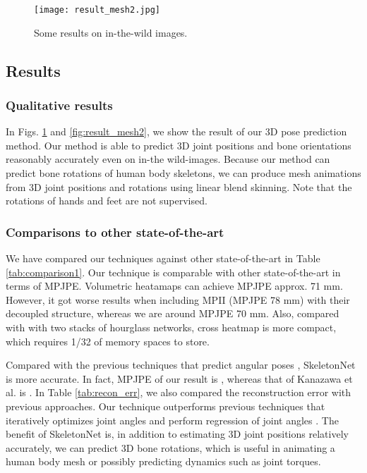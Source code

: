 \begin{figure}[tb]
	\centering
	\texttt{[image: result\_mesh2.jpg]}
	\caption{Some results on in-the-wild images. }
	\label{fig:result_mesh}
\end{figure}

\subsection{Results}
\subsubsection{Qualitative results}

In Figs. \ref{fig:result_mesh} and \ref{fig:result_mesh2}, we show the result of our 3D pose prediction method. Our method is able to predict 3D joint positions and bone orientations reasonably accurately even on in-the wild-images. Because our method can predict bone rotations of human body skeletons, we can produce mesh animations from 3D joint positions and rotations using linear blend skinning. Note that the rotations of hands and feet are not supervised.     





\subsubsection{Comparisons to other state-of-the-art}

We have compared our techniques against other state-of-the-art in Table \ref{tab:comparison1}. Our technique is comparable with other state-of-the-art in terms of MPJPE.  Volumetric heatamaps \cite{PavlakosZDD16} can achieve MPJPE approx. 71 mm. However, it got worse results when including MPII (MPJPE 78 mm) with their decoupled structure, whereas we are around MPJPE 70 mm. Also, compared with \cite{PavlakosZDD16} with two stacks of hourglass networks, cross heatmap is more compact, which requires 1/32 of memory spaces to store. 

Compared with the previous techniques that predict angular poses \cite{zhou2016deep,hmrKanazawa17}, SkeletonNet is more accurate. In fact, MPJPE of our result is , whereas that of Kanazawa et al. \cite{hmrKanazawa17} is . In Table \ref{tab:recon_err}, we also compared the reconstruction error with previous approaches. Our technique outperforms previous techniques that iteratively optimizes joint angles \cite{bogo2016keep} and perform regression of joint angles \cite{pavlakos2018humanshape}. The benefit of SkeletonNet is, in addition to estimating 3D joint positions relatively accurately, we can predict 3D bone rotations, which is useful in animating a human body mesh or possibly predicting dynamics such as joint torques.  
















